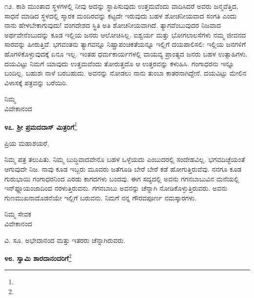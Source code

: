 ೧೨. ಕಾಶಿ ಮುಂತಾದ ಸ್ಥಳಗಳಲ್ಲಿ ನೀವು ಅದನ್ನು ಸ್ಥಾಪಿಸುವುದು ಉತ್ತಮವೆಂದು ವಾದಿಸಿದರೆ \enginline{-} ಅವರು ಜನ್ಮವೆತ್ತಿದ, ಸಾಧನೆ ಮಾಡಿದ ಸ್ಥಳದಲ್ಲಿ ಸ್ಮಾರಕ ಮಂದಿರವನ್ನು ಕಟ್ಟದೇ ಇರುವುದು ಬಹಳ ಶೋಚನೀಯವಾದ ಸಂಗತಿ ಎಂದು ನಾನು ಹೇಳಬೇಕಾಗುವುದು! ವಂಗದೇಶದ ಸ್ಥಿತಿ ಅತಿ ಶೋಚನೀಯವಾಗಿದೆ. ತ್ಯಾಗವೆಂಬುವುದರ ನಿಜವಾದ ಅರ್ಥವೇನೆಂಬುದನ್ನು ಕೂಡ ಇಲ್ಲಿಯ ಜನರು ಆಲೋಚಿಸಿಲ್ಲ. ಐಶ್ವರ್ಯ ಮತ್ತು ಭೋಗಲಾಲಸೆಗಳು ನಮ್ಮ ಜೀವನದ ಸಾರವನ್ನು ಹೀರುತ್ತಿವೆ. ಭಗವಂತನು ತ್ಯಾಗವನ್ನೂ ನಿಷ್ಪ್ರಾಪಂಚಿಕತೆಯನ್ನೂ ಇಲ್ಲಿಗೆ ದಯಪಾಲಿಸಲಿ: ಇಲ್ಲಿಯ ಜನಗಳಿಗೆ ಹೊಗಳಿಕೊಳ್ಳುವುದಕ್ಕೆ ಏನೂ ಇಲ್ಲ. ಇಂತಹ ಧರ್ಮಕಾರ್ಯಗಳಲ್ಲಿ ವಾಯವ್ಯ ಪ್ರಾಂತ್ಯದ ಜನರು ಬಹಳ ಉತ್ಸಾಹಿಗಳು. ದಯವಿಟ್ಟು ನಿಮಗೆ ಯಾವುದು ಉತ್ತಮವೆಂದು ತೋರುತ್ತದೊ ಆ ಉತ್ತರವನ್ನು ಕಳುಹಿಸಿ. ಗಂಗಾಧರನು ಇನ್ನೂ ಬಂದಿಲ್ಲ. ಬಹುಶಃ ನಾಳೆ ಬರಬಹುದು. ಅವನನ್ನು ನೋಡಲು ನಾನು ತುಂಬಾ ಕಾತರನಾಗಿದ್ದೇನೆ. ದಯವಿಟ್ಟು ಮೇಲಿನ ವಿಳಾಸಕ್ಕೆ ಪತ್ರವನ್ನು ಬರೆಯಿರಿ.

\vspace{-0.55cm}

{\flushright
ನಿಮ್ಮ\\ವಿವೇಕಾನಂದ\par}

\begin{center}
\textbf{೪೭. ಶ‍್ರೀ ಪ್ರಮದದಾಸ್ ಮಿತ್ರರಿಗೆ}\footnote{}
\end{center}

\vspace{-0.5cm}

\begin{flushright}
{\fontsize{11pt}{11pt}\selectfont{ಬಾಗ್‌ಬಜಾರ್\\[-2pt] ೪ನೇ ಜೂನ್ ೧೮೯೦}}
\end{flushright}

\vspace{-0.5cm}
\noindent
ಪ್ರಿಯ ಮಹಾಶಯರೆ,

ನಿಮ್ಮ ಪತ್ರ ತಲುಪಿತು. ನಿಮ್ಮ ಬುದ್ಧಿವಾದವೇನೊ ಬಹಳ ಒಳ್ಳೆಯದು ಎಂಬುದರಲ್ಲಿ ಸಂದೇಹವಿಲ್ಲ. ಭಗವದಿಚ್ಛೆಯಂತೆ ಆಗುವುದೇ ನಿಜ. ನಾವು ಕೂಡ ಇಬ್ಬರು ಮೂವರು ಜತೆಗೂಡಿ ಬೇರೆ ಬೇರೆ ಕಡೆ ಹೋಗುತ್ತಿರುವೆವು. ನನಗೂ ಕೂಡ ಗುರುಭಾಯಿ ಗಂಗಾಧರನಿಂದ ಎರಡು ಕಾಗದಗಳು ಬಂದವು. ಈಗ ಸದ್ಯದಲ್ಲಿ ಅವನು ಗಗನಬಾಬುವಿನ ಮನೆಯಲ್ಲಿ ಇನ್‌ಫ್ಲೂಯಂಜಾದಿಂದ ನರಳುತ್ತಿರುವನು. ಗಗನಬಾಬು ಅವನನ್ನು ಚೆನ್ನಾಗಿ ನೋಡಿಕೊಳ್ಳುತ್ತಿರುವರು. ಅವನು ಗುಣಮುಖನಾದೊಡನೆಯೇ ಇಲ್ಲಿಗೆ ಬರುವನು. ನಿಮಗೆ ನನ್ನ ಗೌರವಪೂರ್ಣ ನಮಸ್ಕಾರಗಳು.
\vspace{-0.5cm}

\begin{flushright}
ನಿಮ್ಮ ಸೇವಕ\\ವಿವೇಕಾನಂದ
\end{flushright}
\vspace{-0.5cm}

ವಿ. ಸೂ. \enginline{-}ಅಭೇದಾನಂದ ಮತ್ತು ಇತರರು ಚೆನ್ನಾಗಿರುವರು.

\begin{center}
\textbf{೪೮. ಸ್ವಾಮಿ ಶಾರದಾನಂದರಿಗೆ}\footnote{}
\end{center}

